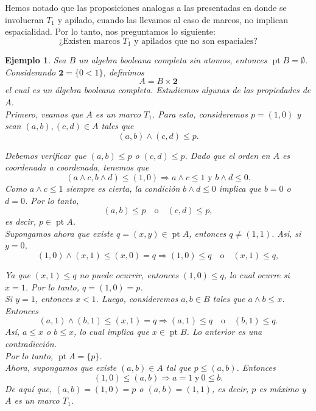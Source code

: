 \documentclass[12pt]{article}
\newtheorem{ej}[thm]{Ejemplo}
\DeclareMathOperator{\pt}{pt}
\begin{document}
Hemos notado que las proposiciones analogas a las presentadas en \cite{sexton2006ordinal,simmons2004vietoris} donde se involucran $T_1$ y apilado, 
cuando las llevamos al caso de marcos, no implican espacialidad. 
Por lo tanto, nos preguntamos lo siguiente:
\[
\text{¿Existen marcos } T_1 \text{ y apilados que no son espaciales?}
\]

\begin{ej}\label{No espacial}
Sea $B$ un algebra booleana completa sin atomos, entonces $\pt B=\emptyset$. Considerando $\mathbf{2}=\{0<1\}$, definimos
\[
A=B\times \mathbf{2}
\]
el cual es un álgebra booleana completa. Estudiemos algunas de las propiedades de $A$.\\

Primero, veamos que $A$ es un marco $T_1$. Para esto, consideremos $p=(1,0)$ y sean $(a,b), (c,d)\in A$ tales que
\[
(a,b)\wedge (c, d)\leq p.
\]

Debemos verificar que $(a,b)\leq p$ o $(c,d)\leq p$. Dado que el orden en $A$ es coordenada a coordenada, tenemos que
\[
(a\wedge c, b\wedge d)\leq (1,0)\Rightarrow a\wedge c\leq 1 \text{ y } b\wedge d\leq 0.
\]
Como $a\wedge c\leq 1$ siempre es cierta, la condición $b\wedge d\leq 0$ implica que $b=0$ o $d=0$. Por lo tanto, 
\[
(a,b)\leq p \quad \text{o} \quad (c,d)\leq p,
\]
es decir, $p\in \pt A$.\\

Supongamos ahora que existe $q=(x, y)\in \pt A$, entonces $q\neq (1,1)$. Asi, si $y=0$,
\[
(1,0)\wedge (x, 1)\leq (x,0)=q\Rightarrow (1, 0)\leq q\quad\text{o}\quad (x, 1)\leq q,
\]

Ya que $(x, 1)\leq q$ no puede ocurrir, entonces $(1,0)\leq q$, lo cual ocurre si $x=1$. Por lo tanto, $q=(1,0)=p$.\\

Si $y=1$, entonces $x<1$. Luego, consideremos $a, b\in B$ tales que $a\wedge b\leq x$. Entonces
\[
(a,1)\wedge (b,1)\leq (x,1)=q\Rightarrow (a,1)\leq q\quad\text{o}\quad (b,1)\leq q.
\]
Así, $a\leq x$ o $b\leq x$, lo cual implica que $x\in \pt B$. Lo anterior es una contradicción.\\

Por lo tanto, $\pt A=\{p\}$.\\

Ahora, supongamos que existe $(a, b)\in A$ tal que $p\leq (a, b)$. Entonces
\[
(1,0)\leq (a,b)\Rightarrow a=1\; \text{y}\ 0\leq b.
\]
De aquí que, $(a, b)=(1, 0)=p$ o $(a, b)=(1,1)$, es decir, $p$ es máximo y $A$ es un marco $T_1$.\\


\end{ej}
\end{document}
